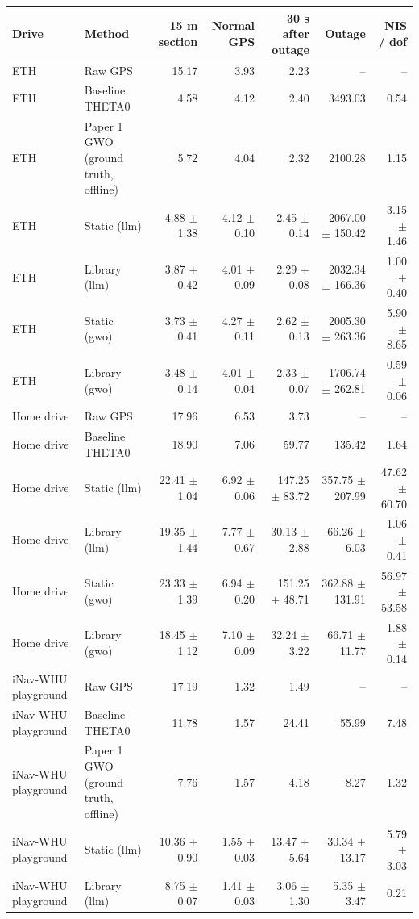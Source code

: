 \begin{tabular}{llrrrrr}
\toprule
Drive & Method & 15 m section & Normal GPS & 30 s after outage & Outage & NIS / dof \\
\midrule
ETH & Raw GPS & 15.17 & 3.93 & 2.23 & -- & -- \\
ETH & Baseline THETA0 & 4.58 & 4.12 & 2.40 & 3493.03 & 0.54 \\
ETH & Paper 1 GWO (ground truth, offline) & 5.72 & 4.04 & 2.32 & 2100.28 & 1.15 \\
ETH & Static (llm) & 4.88 $\pm$ 1.38 & 4.12 $\pm$ 0.10 & 2.45 $\pm$ 0.14 & 2067.00 $\pm$ 150.42 & 3.15 $\pm$ 1.46 \\
ETH & Library (llm) & 3.87 $\pm$ 0.42 & 4.01 $\pm$ 0.09 & 2.29 $\pm$ 0.08 & 2032.34 $\pm$ 166.36 & 1.00 $\pm$ 0.40 \\
ETH & Static (gwo) & 3.73 $\pm$ 0.41 & 4.27 $\pm$ 0.11 & 2.62 $\pm$ 0.13 & 2005.30 $\pm$ 263.36 & 5.90 $\pm$ 8.65 \\
ETH & Library (gwo) & 3.48 $\pm$ 0.14 & 4.01 $\pm$ 0.04 & 2.33 $\pm$ 0.07 & 1706.74 $\pm$ 262.81 & 0.59 $\pm$ 0.06 \\
Home drive & Raw GPS & 17.96 & 6.53 & 3.73 & -- & -- \\
Home drive & Baseline THETA0 & 18.90 & 7.06 & 59.77 & 135.42 & 1.64 \\
Home drive & Static (llm) & 22.41 $\pm$ 1.04 & 6.92 $\pm$ 0.06 & 147.25 $\pm$ 83.72 & 357.75 $\pm$ 207.99 & 47.62 $\pm$ 60.70 \\
Home drive & Library (llm) & 19.35 $\pm$ 1.44 & 7.77 $\pm$ 0.67 & 30.13 $\pm$ 2.88 & 66.26 $\pm$ 6.03 & 1.06 $\pm$ 0.41 \\
Home drive & Static (gwo) & 23.33 $\pm$ 1.39 & 6.94 $\pm$ 0.20 & 151.25 $\pm$ 48.71 & 362.88 $\pm$ 131.91 & 56.97 $\pm$ 53.58 \\
Home drive & Library (gwo) & 18.45 $\pm$ 1.12 & 7.10 $\pm$ 0.09 & 32.24 $\pm$ 3.22 & 66.71 $\pm$ 11.77 & 1.88 $\pm$ 0.14 \\
iNav-WHU playground & Raw GPS & 17.19 & 1.32 & 1.49 & -- & -- \\
iNav-WHU playground & Baseline THETA0 & 11.78 & 1.57 & 24.41 & 55.99 & 7.48 \\
iNav-WHU playground & Paper 1 GWO (ground truth, offline) & 7.76 & 1.57 & 4.18 & 8.27 & 1.32 \\
iNav-WHU playground & Static (llm) & 10.36 $\pm$ 0.90 & 1.55 $\pm$ 0.03 & 13.47 $\pm$ 5.64 & 30.34 $\pm$ 13.17 & 5.79 $\pm$ 3.03 \\
iNav-WHU playground & Library (llm) & 8.75 $\pm$ 0.07 & 1.41 $\pm$ 0.03 & 3.06 $\pm$ 1.30 & 5.35 $\pm$ 3.47 & 0.21 \\

\end{tabular}
